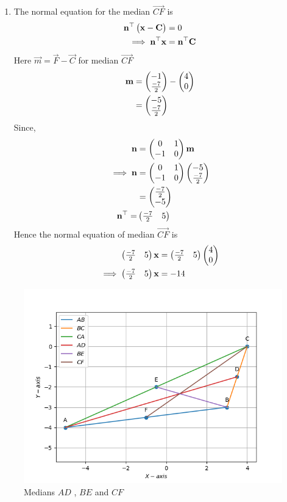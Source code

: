 \documentclass[10pt]{book}
\begin{document}
\begin{enumerate}[label=\thesection.\arabic*.,ref=\thesection.\theenumi]
\begin{enumerate}
\item The normal equation for the median $\vec{CF}$ is
\begin{align}
\mathbf{n}^{\top}\begin{pmatrix}\mathbf{x}-\mathbf{C}\end{pmatrix}&=0\\
\implies
\mathbf{n}^{\top}\mathbf{x}&=\mathbf{n}^{\top}\mathbf{C}
\end{align}
Here $\vec{m} = \vec{F}- \vec{C}$ for median $\vec{CF}$
\begin{align}
\mathbf{m}&=\begin{pmatrix}-1 \\ \frac{-7}{2}\end{pmatrix} - \begin{pmatrix}4\\0\end{pmatrix}\\
       &=\begin{pmatrix}-5 \\ \frac{-7}{2}\end{pmatrix}
\end{align}
Since,
\begin{align}
  \mathbf{n} &= \begin{pmatrix}0 & 1\\
  -1 & 0\end{pmatrix}\mathbf{m}\\
\implies
\mathbf{n} &= \begin{pmatrix}0 & 1\\
  -1 & 0\end{pmatrix}\begin{pmatrix}-5 \\ \frac{-7}{2} \end{pmatrix}\\
        &= \begin{pmatrix}\frac{-7}{2} \\ -5\end{pmatrix} \\
        \mathbf{n}^{\top} = &\begin{pmatrix}\frac{-7}{2} & 5\end{pmatrix}
\end{align}
Hence the normal equation of median $\vec{CF}$ is 
\begin{align}
    \begin{pmatrix}\frac{-7}{2} & 5 \end{pmatrix}\mathbf{x}&=\begin{pmatrix}\frac{-7}{2} & 5\end{pmatrix}\begin{pmatrix}4\\0\end{pmatrix}\\
    \implies
    \begin{pmatrix}\frac{-7}{2} & 5\end{pmatrix}\mathbf{x}&=-14
\end{align}
\end{enumerate}
\begin{figure}[H]
\includegraphics[width=\columnwidth]{figs/DEF_medians.png}
\caption{ Medians $AD$ , $BE$ and $CF$}
\label{fig:DEF_medians}
\end{figure}


\end{enumerate}
\end{document}
